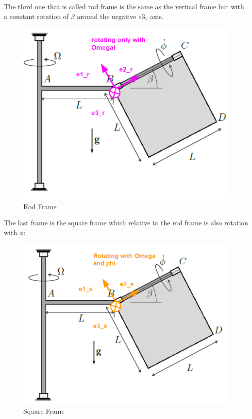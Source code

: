 The third one that is called rod frame is the same as the vertical frame but with a constant rotation of $\beta$ around the negative $e3_v$ axis.

\begin{figure}[ht]
    \centering
    \includegraphics[scale=0.5]{images/rod_frame.png}
    \caption{Rod Frame}
    \label{fig:rod_frame}
\end{figure}

The last frame is the square frame which relative to the rod frame is also rotation with $\phi$:

\begin{figure}[ht]
    \centering
    \includegraphics[scale=0.5]{images/square_frame.png}
    \caption{Square Frame}
    \label{fig:square_frame}
\end{figure}


